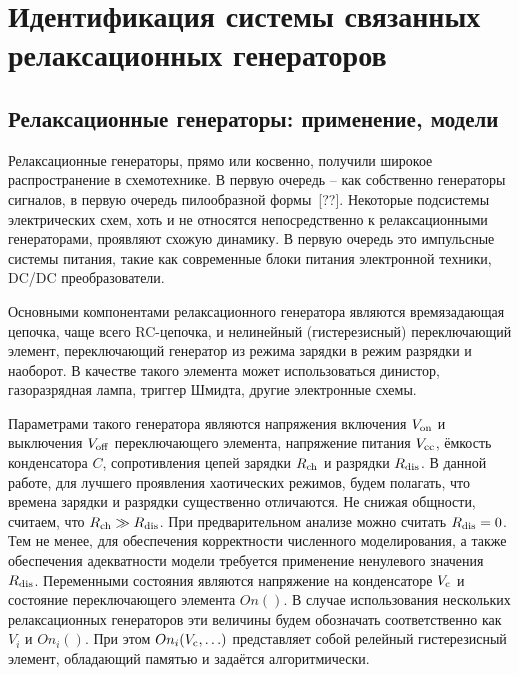 \chapter{Идентификация системы связанных релаксационных генераторов}

\newcommand{\RelaxBjtIi}{системы из трёх связанных релаксационных генераторов на паре комплиментарных транзисторов}
\newcommand{\RelaxShIi}{системы из трёх связанных релаксационных генераторов на основе триггеров Шмидта}

\section{Релаксационные генераторы: применение, модели}


Релаксационные генераторы, прямо или косвенно, получили широкое распространение
в схемотехнике. В первую очередь -- как собственно генераторы
сигналов, в первую очередь пилообразной формы~[??].
Некоторые подсистемы электрических схем, хоть и не относятся непосредственно к
релаксационными генераторами, проявляют схожую динамику.
В первую очередь это импульсные системы питания, такие как
современные блоки питания электронной техники, DC/DC преобразователи.

Основными компонентами релаксационного генератора являются
времязадающая цепочка, чаще всего RC-цепочка,
и нелинейный (гистерезисный) переключающий элемент,
переключающий генератор из режима зарядки в режим разрядки и наоборот.
В качестве такого элемента может использоваться
динистор, газоразрядная лампа, триггер Шмидта,
другие электронные схемы.


Параметрами такого генератора являются
напряжения включения $V_\mathrm{on}$ и выключения $V_\mathrm{off}$
переключающего элемента,
напряжение питания $V_\mathrm{cc}$,
ёмкость конденсатора $C$,
сопротивления цепей зарядки $R_\mathrm{ch}$
и разрядки $R_\mathrm{dis}$.
В данной работе, для лучшего проявления
хаотических режимов,
будем полагать, что времена зарядки и разрядки существенно отличаются.
Не снижая общности, считаем, что $R_\mathrm{ch} \gg R_\mathrm{dis} $.
При предварительном анализе можно считать $R_\mathrm{dis} = 0$.
Тем не менее, для обеспечения корректности численного моделирования,
а также обеспечения адекватности модели требуется применение ненулевого значения $R_\mathrm{dis}$.
Переменными состояния являются напряжение на конденсаторе $V_\mathrm{c}$
и состояние переключающего элемента $On()$.
В случае использования нескольких релаксационных генераторов
эти величины будем обозначать соответственно как
$V_{i}$ и $ On_{i}()$.
При этом  $ On_{i}( V_\mathrm{c}, \ldots )$ представляет собой
релейный гистерезисный элемент, обладающий памятью и задаётся алгоритмически.

